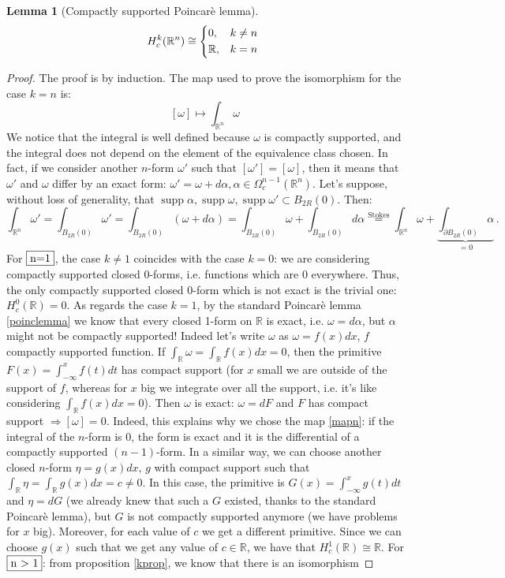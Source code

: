 \documentclass[a4paper,11pt,titlepage, article, oneside]{memoir}
\numberwithin{equation}{section}
\newtheorem{lemma}[theorem]{Lemma}
\theoremstyle{definition}
\theoremstyle{remark}
\DeclareMathOperator{\supp}{supp}
\newcommand{\rfield}{\mathbb{R}}
\begin{document}
\begin{lemma}[Compactly supported Poincarè lemma] \label{compsupppoinclemma}
\begin{equation}
H_c^k(\rfield^n) \cong 
\begin{cases*}
0, & $k \not = n$ \\
\rfield, & $k = n$
\end{cases*}
\end{equation}
\end{lemma}
\begin{proof}
The proof is by induction. The map used to prove the isomorphism for the case $k = n$ is:
\begin{equation} \label{mapn}
[\omega] \mapsto \int_{\rfield^n} \omega
\end{equation}
We notice that the integral is well defined because $\omega$ is compactly supported, and the integral does not depend on the element of the equivalence class chosen. In fact, if we consider another $n$-form $\omega'$ such that $[\omega'] = [\omega]$, then it means that $\omega'$ and $\omega$ differ by an exact form: $\omega' = \omega + d \alpha, \alpha \in \Omega_c^{n-1}(\rfield^n)$. Let's suppose, without loss of generality, that $\supp \alpha, \supp \omega, \supp \omega' \subset B_{2R}(0)$. Then:
\[ \int_{\rfield^n} \omega' = \int_{B_{2R}(0)} \omega' = \int_{B_{2R}(0)}(\omega + d \alpha) = \int_{B_{2R}(0)}\omega + \int_{B_{2R}(0)} d \alpha \overset{\text{Stokes}} = \int_{\rfield^n} \omega + \underbrace{\int_{\partial B_{2R}(0)} \alpha}_{=0} \, . \]
For $\fbox{n=1}$, the case $k \not = 1$ coincides with the case $k=0$: we are considering compactly supported closed 0-forms, i.e. functions which are 0 everywhere. Thus, the only compactly supported closed 0-form which is not exact is the trivial one:  $H^0_c(\rfield) = 0$. As regards the case $k=1$, by the standard Poincarè lemma \eqref{poinclemma} we know that every closed 1-form on $\rfield$ is exact, i.e. $\omega = d\alpha$, but $\alpha$ might not be compactly supported! Indeed let's write $\omega$ as $\omega=f(x) dx$, $f$ compactly supported function. If $\int_{\rfield} \omega = \int_{\rfield} f(x)dx = 0$, then the primitive $F(x)=\int_{-\infty}^x f(t)dt$ has compact support (for $x$ small we are outside of the support of $f$, whereas for $x$ big we integrate over all the support, i.e. it's like considering $\int_{\rfield} f(x) dx = 0$). Then $\omega$ is exact: $\omega = dF$ and $F$ has compact support $\Rightarrow [\omega]=0$. Indeed, this explains why we chose the map \eqref{mapn}: if the integral of the $n$-form is 0, the form is exact and it is the differential of a compactly supported $(n-1)$-form. In a similar way, we can choose another closed $n$-form $\eta=g(x)dx,\, g$ with compact support such that $\int_{\rfield}\eta = \int_{\rfield} g(x)dx=c \not=0$. In this case, the primitive is $G(x) = \int_{-\infty}^x g(t)dt$ and $\eta = dG$ (we already knew that such a $G$ existed, thanks to the standard Poincarè lemma), but $G$ is not compactly supported anymore (we have problems for $x$ big). Moreover, for each value of $c$ we get a different primitive. Since we can choose $g(x)$ such that we get any value of $c \in \rfield$, we have that $H_c^1(\rfield) \cong \rfield$. For $\fbox{n > 1}$: from proposition \ref{kprop}, we know that there is an isomorphism 

\end{proof}
\end{document}
